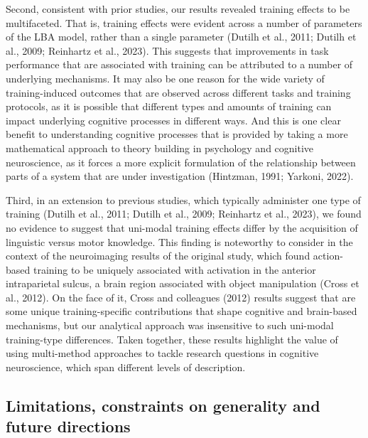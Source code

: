 \documentclass[
  english,
  man, donotrepeattitle,floatsintext]{apa6}
\begin{document}
Second, consistent with prior studies, our results revealed training effects to be multifaceted. That is, training effects were evident across a number of parameters of the LBA model, rather than a single parameter (Dutilh et al., 2011; Dutilh et al., 2009; Reinhartz et al., 2023). This suggests that improvements in task performance that are associated with training can be attributed to a number of underlying mechanisms. It may also be one reason for the wide variety of training-induced outcomes that are observed across different tasks and training protocols, as it is possible that different types and amounts of training can impact underlying cognitive processes in different ways. And this is one clear benefit to understanding cognitive processes that is provided by taking a more mathematical approach to theory building in psychology and cognitive neuroscience, as it forces a more explicit formulation of the relationship between parts of a system that are under investigation (Hintzman, 1991; Yarkoni, 2022).

Third, in an extension to previous studies, which typically administer one type of training (Dutilh et al., 2011; Dutilh et al., 2009; Reinhartz et al., 2023), we found no evidence to suggest that uni-modal training effects differ by the acquisition of linguistic versus motor knowledge. This finding is noteworthy to consider in the context of the neuroimaging results of the original study, which found action-based training to be uniquely associated with activation in the anterior intraparietal sulcus, a brain region associated with object manipulation (Cross et al., 2012). On the face of it, Cross and colleagues (2012) results suggest that are some unique training-specific contributions that shape cognitive and brain-based mechanisms, but our analytical approach was insensitive to such uni-modal training-type differences. Taken together, these results highlight the value of using multi-method approaches to tackle research questions in cognitive neuroscience, which span different levels of description.

\subsection{Limitations, constraints on generality and future directions}\label{limitations-constraints-on-generality-and-future-directions}
\end{document}
